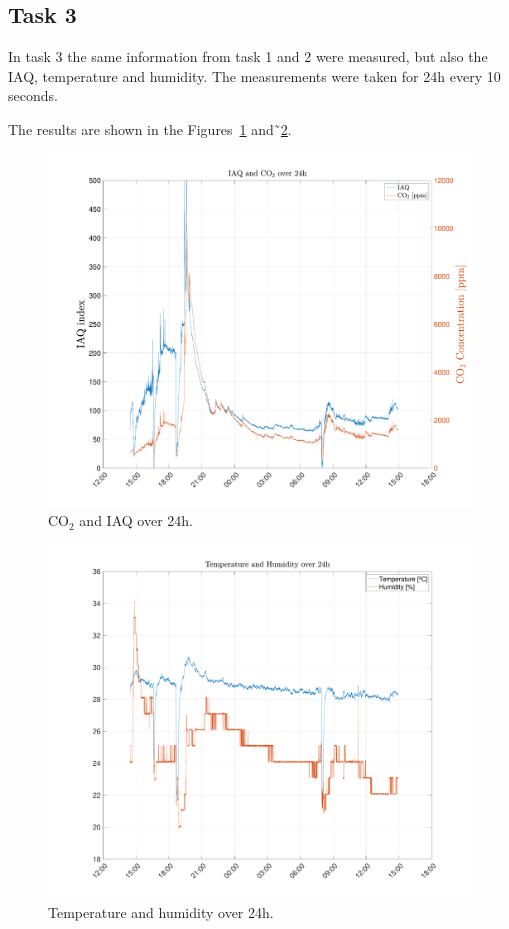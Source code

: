 \documentclass[DIV=14]{scrartcl}
\begin{document}
    \subsection*{Task 3}
    In task 3 the same information from task 1 and 2 were measured, but also the IAQ, temperature and humidity.
    The measurements were taken for 24h every 10 seconds.

    The results are shown in the Figures~\ref{fig:co2IaqAndVoc} and˜\ref{fig:tempHum}.

    \begin{figure}[!ht]
        \centering
        \includegraphics[width=.8\textwidth]{plots/plotCO2IAQ}
        \caption{$\mathrm{CO_2}$ and IAQ over 24h.}
        \label{fig:co2IaqAndVoc}
    \end{figure}

    \begin{figure}[!ht]
        \centering
        \includegraphics[width=.8\textwidth]{plots/plotTempHum}
        \caption{Temperature and humidity over 24h.}
        \label{fig:tempHum}
    \end{figure}
\end{document}
